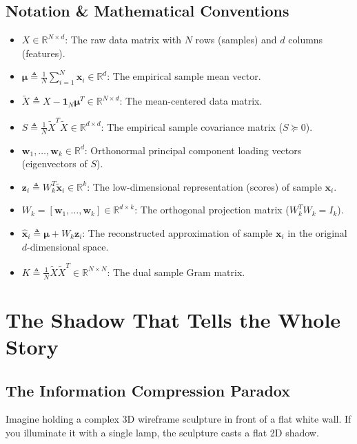 \subsection{Notation \& Mathematical Conventions}
\begin{itemize}
    \item $X \in \mathbb{R}^{N \times d}$: The raw data matrix with $N$ rows (samples) and $d$ columns (features).
    \item $\boldsymbol{\mu} \triangleq \frac{1}{N} \sum_{i=1}^N \mathbf{x}_i \in \mathbb{R}^d$: The empirical sample mean vector.
    \item $\tilde{X} \triangleq X - \mathbf{1}_N \boldsymbol{\mu}^T \in \mathbb{R}^{N \times d}$: The mean-centered data matrix.
    \item $S \triangleq \frac{1}{N} \tilde{X}^T \tilde{X} \in \mathbb{R}^{d \times d}$: The empirical sample covariance matrix ($S \succeq 0$).
    \item $\mathbf{w}_1, \dots, \mathbf{w}_k \in \mathbb{R}^d$: Orthonormal principal component loading vectors (eigenvectors of $S$).
    \item $\mathbf{z}_i \triangleq W_k^T \tilde{\mathbf{x}}_i \in \mathbb{R}^k$: The low-dimensional representation (scores) of sample $\mathbf{x}_i$.
    \item $W_k = [\mathbf{w}_1, \dots, \mathbf{w}_k] \in \mathbb{R}^{d \times k}$: The orthogonal projection matrix ($W_k^T W_k = I_k$).
    \item $\hat{\mathbf{x}}_i \triangleq \boldsymbol{\mu} + W_k \mathbf{z}_i$: The reconstructed approximation of sample $\mathbf{x}_i$ in the original $d$-dimensional space.
    \item $K \triangleq \frac{1}{N}\tilde{X}\tilde{X}^T \in \mathbb{R}^{N \times N}$: The dual sample Gram matrix.
\end{itemize}

\section{The Shadow That Tells the Whole Story}

\subsection{The Information Compression Paradox}
Imagine holding a complex 3D wireframe sculpture in front of a flat white wall. If you illuminate it with a single lamp, the sculpture casts a flat 2D shadow. 

